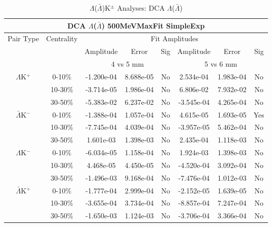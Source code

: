 \documentclass[../AnalysisNoteJBuxton.tex]{subfiles}
\begin{document}
\begin{table}
 \centering
 \begin{tabular}{|c|c|c|c|c||c|c|c|}
  \multicolumn{8}{c}{DCA $\Lambda$($\bar{\Lambda}$) 500MeVMaxFit SimpleExp} \\
  \hline
  \multirow{3}{*}{Pair Type} & \multirow{3}{*}{Centrality} & \multicolumn{6}{c|}{Fit Amplitudes} \\
  \cline{3-8}
   & & Amplitude & Error & Sig & Amplitude & Error & Sig \\  
  \cline{3-8}
   & & \multicolumn{3}{c||}{4 vs 5 mm} & \multicolumn{3}{c|}{5 vs 6 mm} \\  
  \hline
  \multirow{3}{*}{$\Lambda$K$^{+}$}
   &  0-10\% & -1.200e-04 & 8.688e-05 & No & 2.534e-04 & 1.983e-04 & No \\
   & 10-30\% & -3.714e-05 & 1.986e-04 & No & 6.806e-02 & 7.932e-02 & No \\
   & 30-50\% & -5.383e-02 & 6.237e-02 & No & -3.545e-04 & 4.265e-04 & No \\
  \hline
  \multirow{3}{*}{$\bar{\Lambda}$K$^{-}$}
   &  0-10\% & -1.388e-04 & 1.057e-04 & No & 4.615e-05 & 1.693e-05 & Yes \\
   & 10-30\% & -7.745e-04 & 4.039e-04 & No & -3.957e-05 & 5.462e-04 & No \\
   & 30-50\% & 1.601e-03 & 1.398e-03 & No & 2.435e-04 & 1.118e-03 & No \\
  \hline \hline
  \multirow{3}{*}{$\Lambda$K$^{-}$}
   &  0-10\% & -6.034e-05 & 1.158e-04 & No & 1.924e-03 & 1.398e-03 & No \\
   & 10-30\% & 4.468e-05 & 4.450e-05 & No & -4.520e-04 & 3.092e-04 & No \\
   & 30-50\% & -1.496e-03 & 9.168e-04 & No & -7.476e-04 & 1.012e-03 & No \\
  \hline
  \multirow{3}{*}{$\bar{\Lambda}$K$^{+}$}
   &  0-10\% & -1.777e-04 & 2.999e-04 & No & -2.152e-05 & 1.639e-05 & No \\
   & 10-30\% & -3.655e-04 & 3.734e-04 & No & -8.857e-04 & 7.247e-04 & No \\
   & 30-50\% & -1.650e-03 & 1.124e-03 & No & -3.706e-04 & 3.366e-04 & No \\
  \hline
 \end{tabular}
 \caption{$\Lambda$($\bar{\Lambda}$)K$^{\pm}$ Analyses: DCA $\Lambda$($\bar{\Lambda}$)}
 \label{tab:V0DcaLamKch_500MeVMaxFit_SimpleExp}
\end{table}



\end{document}
